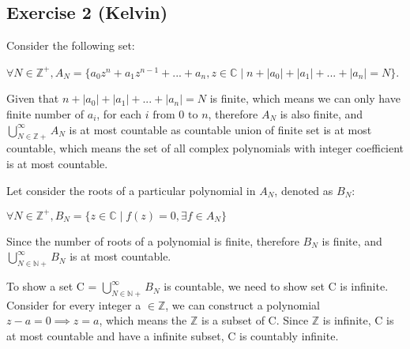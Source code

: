 \subsection*{Exercise 2 (Kelvin)}
Consider the following set:

$\forall{N} \in \mathbb{Z^+}, A_N = \{a_0z^n + a_1z^{n-1} + ... + a_n, z \in \mathbb{C}\mid n + |a_0| + |a_1| + ... + |a_n| = N\}$.

Given that $n + |a_0| + |a_1| + ... + |a_n| = N$ is finite, which means we can only have finite number of $a_i$, for each $\text{$i$ from 0 to $n$} $, 
therefore $A_N$ is also finite, 
and $\bigcup_{N \in \mathbb{Z+}}^{\infty} A_N$ is at most countable as countable union of finite set is at most countable, which means the set of all complex polynomials with integer coefficient is at most countable.

Let consider the roots of a particular polynomial in $A_N$, denoted as $B_N$:

$\forall{N} \in \mathbb{Z^+}, B_N = \{z \in \mathbb{C}\mid f(z) = 0, \exists{f} \in A_N \}$

Since the number of roots of a polynomial is finite, therefore $B_N$ is finite, and $\bigcup_{N \in \mathbb{N+}}^{\infty} B_N$ is at most countable.

To show a set C = $\bigcup_{N \in \mathbb{N+}}^{\infty} B_N$ is countable, we need to show set C is infinite. Consider for every integer a $\in \mathbb{Z}$,
we can construct a polynomial $z - a = 0 \implies z = a$, which means the $\mathbb{Z}$ is a subset of C. Since $\mathbb{Z}$ is infinite, C is at most countable and
have a infinite subset, C is countably infinite.

